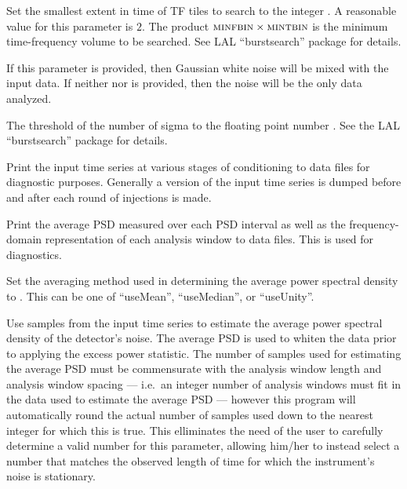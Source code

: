 \begin{entry}
\begin{entry}
\item[\option{--min-time-bin} \parm{ntbin}]
Set the smallest extent in time of TF tiles to search to the integer
.  A reasonable value for this parameter is $2$.   The product
$\mbox{\textsc{minfbin}} \times \mbox{\textsc{mintbin}}$ is the minimum
time-frequency volume to be searched.  See LAL ``burstsearch'' package for
details.

\item[\option{--noise-amplitude} \parm{amplitude}]
If this parameter is provided, then Gaussian white noise will be mixed with
the input data.  If neither  nor 
is provided, then the noise will be the only data analyzed.

\item[\option{--nsigma} \parm{sigma}]
The threshold of the number of sigma to the floating point number
.  See the LAL ``burstsearch'' package for details.

\item[\option{--printData}]
Print the input time series at various stages of conditioning to data files
for diagnostic purposes.  Generally a version of the input time series is
dumped before and after each round of injections is made.

\item[\option{--printSpectrum}]
Print the average PSD measured over each PSD interval as well as the
frequency-domain representation of each analysis window to data files.
This is used for diagnostics.

\item[\option{--psd-average-method} \parm{method}]
Set the averaging method used in determining the average power spectral
density to .  This can be one of ``useMean'', ``useMedian'',
or ``useUnity''.

\item[\option{--psd-average-points} \parm{samples}]
Use  samples from the input time series to estimate the
average power spectral density of the detector's noise.  The average PSD is
used to whiten the data prior to applying the excess power statistic.  The
number of samples used for estimating the average PSD must be commensurate
with the analysis window length and analysis window spacing --- i.e.\ an
integer number of analysis windows must fit in the data used to estimate
the average PSD --- however this program will automatically round the
actual number of samples used down to the nearest integer for which this is
true.  This elliminates the need of the user to carefully determine a valid
number for this parameter, allowing him/her to instead select a number that
matches the observed length of time for which the instrument's noise is
stationary.


\end{entry}
\end{entry}
